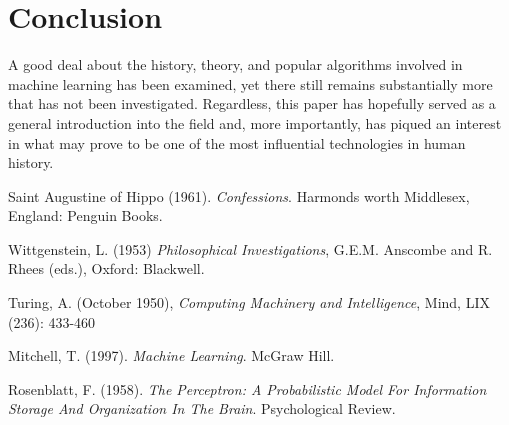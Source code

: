\documentclass[12pt]{article}
\begin{document}
\section*{Conclusion}
A good deal about the history, theory, and popular algorithms involved in machine learning has been examined, yet there still remains substantially more that has not been investigated. Regardless, this paper has hopefully served as a general introduction into the field and, more importantly, has piqued an interest in what may prove to be one of the most influential technologies in human history.     

\begin{thebibliography}{9}
Saint Augustine of Hippo (1961). \emph{Confessions}. Harmonds worth Middlesex, England: Penguin Books. 

Wittgenstein, L. (1953) \emph{Philosophical Investigations}, G.E.M. Anscombe and R. Rhees (eds.), Oxford: Blackwell.

Turing, A. (October 1950), \emph{Computing Machinery and Intelligence}, Mind, LIX (236): 433-460

Mitchell, T. (1997). \emph{Machine Learning}. McGraw Hill.

Rosenblatt, F. (1958). \emph{The Perceptron: A Probabilistic Model For Information Storage And Organization In The Brain}. Psychological Review. 
 
\end{thebibliography}
\end{document}

